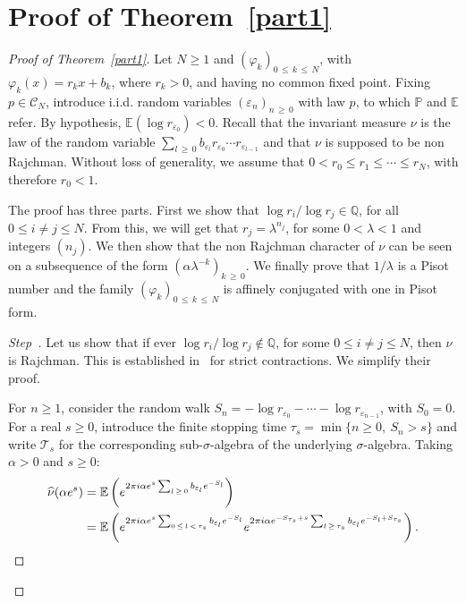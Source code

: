 \documentclass[10pt]{amsart}
\theoremstyle{definition}\newtheorem{defi}[theo]{Definition}\newtheorem{rema}[theo]{Remark}\newtheorem{exam}[theo]{Example}\newtheorem{exem}[theo]{Example}\newtheorem{nota}[theo]{Notation}
\newcommand{\Pbb}{\mathbb P}
\newcommand{\Ebb}{\mathbb E}
\newcommand{\Qbb}{\mathbb Q}
\newcommand{\Ccl}{\mathcal{C}}
\newcommand{\Tcl}{\mathcal{T}}
\newcounter{stepcount}
\newenvironment{step}{\refstepcounter{stepcount}\begin{proof}[Step~\thestepcount]}{\let\qed\relax\end{proof}}
\let\oldhat\hat
\renewcommand*{\hat}[1]{\mathchoice{\widehat{#1}}{\widehat{#1}}{\oldhat{#1}}{\oldhat{#1}}}
\begin{document}
\goodbreak

\section{Proof of Theorem~\ref{part1}}

\begin{proof}[{Proof of Theorem~\ref{part1}}]
Let $N\geq1$ and $(\varphi_k)_{0\,\leq\,k\,\leq\,N}$, with $\varphi_k(x)=r_kx+b_k$, where $r_k>0$, and having no common fixed point. Fixing $p\in {\Ccl}_N$, introduce i.i.d. random variables $(\varepsilon_n)_{n\,\geq\,0}$ with law $p$, to which $\Pbb$ and $\Ebb$ refer. By hypothesis, $\Ebb(\log r_{\varepsilon_0})<0$. Recall that the invariant measure $\nu$ is the law of the random variable $\sum_{l\,\geq\,0}b_{\varepsilon_l}r_{\varepsilon_0}\cdots r_{\varepsilon_{l-1}}$ and that $\nu$ is supposed to be non Rajchman. Without loss of generality, we assume that $0<r_0\leq r_1\leq\cdots\leq r_N$, with therefore $r_0<1$.

The proof has three parts. First we show that $\log r_i/\log r_j\in\Qbb$, for all $0\leq i\not=j\leq N$. From this, we will get that $r_j=\lambda^{n_j}$, for some $0<\lambda<1$ and integers $(n_j)$. We then show that the non Rajchman character of $\nu$ can be seen on a subsequence of the form $(\alpha\lambda^{-k})_{k\,\geq\,0}$. We finally prove that $1/\lambda$ is a Pisot number and the family $(\varphi_k)_{0\,\leq\,k\,\leq\,N}$ is affinely conjugated with one in Pisot form.


\begin{step}\label{step1}
Let us show that if ever $\log r_i/\log r_j\not\in\Qbb$, for some $0\leq i\not=j\leq N$, then $\nu$ is Rajchman. This is established in~\cite{lisa} for strict contractions. We simplify their proof.

For $n\geq1$, consider the random walk $S_n=-\log r_{\varepsilon_0}-\cdots-\log r_{\varepsilon_{n-1}}$, with $S_0=0$. For a real $s\geq0$, introduce the finite stopping time $\tau_s=\min\{n\geq0,~S_n>s\}$ and write ${\Tcl}_s$ for the corresponding sub-$\sigma$-algebra of the underlying $\sigma$-algebra. Taking $\alpha>0$ and $s\geq0$:
\begin{align*}
\hat{\nu}(\alpha e^s)&=\Ebb\left({e^{2\pi i\alpha e^s\sum_{l\,\geq\,0}b_{\varepsilon_l}e^{-S_l}}}\right)\\
&=\Ebb\left({e^{2\pi i\alpha e^{s}\sum_{0\,\leq\,l\,<\,\tau_s}b_{\varepsilon_l}e^{-S_l}}e^{2\pi i\alpha e^{-S_{\tau_s}+s}\sum_{l\,\geq\,\tau_s}b_{\varepsilon_l}e^{-S_l+S_{\tau_s}}}}\right).
\end{align*}



\end{step}
\end{proof}
\end{document}
